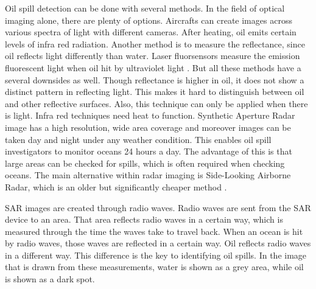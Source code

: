 Oil spill detection can be done with several methods. In the field of optical imaging alone, there are plenty of options. Aircrafts can create images across various spectra of light with different cameras. After heating, oil emits certain levels of infra red radiation. Another method is to measure the reflectance, since oil reflects light differently than water. Laser fluorsensors measure the emission fluorescent light when oil hit by ultraviolet light \cite{fingas2014review}. But all these methods have a several downsides as well. Though reflectance is higher in oil, it does not show a distinct pattern in reflecting light. This makes it hard to distinguish between oil and other reflective surfaces. Also, this technique can only be applied when there is light. Infra red techniques need heat to function.
Synthetic Aperture Radar image has a high resolution, wide area coverage and moreover images can be taken day and night under any weather condition. This enables oil spill investigators to monitor oceans 24 hours a day\cite{Chang20081915}. The advantage of this is that large areas can be checked for spills, which is often required when checking oceans. 
The main alternative within radar imaging is Side-Looking Airborne Radar, which is an older but significantly cheaper method \cite{fingas2014review}. 

SAR images are created through radio waves. Radio waves are sent from the SAR device to an area. That area reflects radio waves in a certain way, which is measured through the time the waves take to travel back. \cite{Doerry:04} When an ocean is hit by radio waves, those waves are reflected in a certain way. Oil reflects radio waves in a different way. This difference is the key to identifying oil spills.
In the image that is drawn from these measurements, water is shown as a grey area, while oil is shown as a dark spot. 







